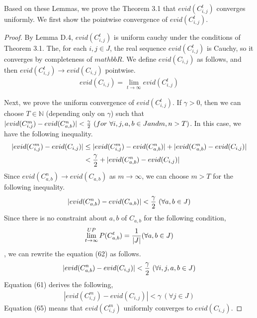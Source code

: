 Based on these Lemmas, we prove the Theorem 3.1 that $evid(C^t_{i,j})$ converges uniformly.
We first show the pointwise convergence of $evid(C^t_{i,j})$.
\begin{proof}
By Lemma D.4, $evid(C^t_{i,j})$ is uniform cauchy under the conditions of Theorem 3.1. 
The, for each $i, j \in J$, the real sequence $evid(C^t_{i,j})$ is Cauchy, 
so it converges by completeness of $mathbb{R}$.
We define $evid(C_{i,j})$ as follows, and then $evid(C^t_{i,j}) \rightarrow evid(C_{i,j})$ pointwise.
\begin{align}
    evid(C_{i,j}) = \lim_{t \rightarrow \infty} evid(C^{t}_{i,j})
\end{align}

Next, we prove the uniform convergence of $evid(C^t_{i,j})$.
If $\gamma > 0$, then we can choose $T \in \mathbb{N}$ (depending only on $\gamma$) such that 
$|evid(C^m_{i,j})-evid(C^n_{a,b})| < {\gamma \over 2}\ (for\ \forall i,j,a,b \in J and m, n > T)$.
In this case, we have the following inequality. 
\begin{align}
    \begin{split}
        |evid(C^m_{i,j})-evid(C_{i,j})| 
        &\leq |evid(C^m_{i,j})-evid(C^n_{a,b})| + |evid(C^n_{a,b})-evid(C_{i,j})|\\
        &< {\gamma \over 2} + |evid(C^n_{a,b})-evid(C_{i,j})|
    \end{split}
\end{align}
Since $evid(C^n_{a,b})\rightarrow evid(C_{a,b})$ as $m\rightarrow \infty$, 
we can choose $m > T$ for the following inequality. 
\begin{align}
    |evid(C^n_{a,b})-evid(C_{a,b})| < {\gamma \over 2}\ (\forall a, b \in J)
\end{align}
Since there is no constraint about $a, b$ of $C_{a,b}$ for the following condition,
\begin{align}
    \lim^{UP}_{t \rightarrow \infty}P(C^t_{a,b})={1 \over |J|} (\forall a,b \in J)
\end{align}
, we can rewrite the equation (62) as follows. 
\begin{align}
    |evid(C^n_{a,b})-evid(C_{i,j})| < {\gamma \over 2}\ (\forall i,j,a,b \in J)
\end{align}
Equation (61) derives the following,
\begin{align}
    |evid(C^{m}_{i,j})-evid(C_{i,j})| < \gamma\ (\forall j \in J)    
\end{align}
Equation (65) means that $evid(C^{m}_{i,j})$ uniformly converges to $evid(C_{i,j})$.


\end{proof}

